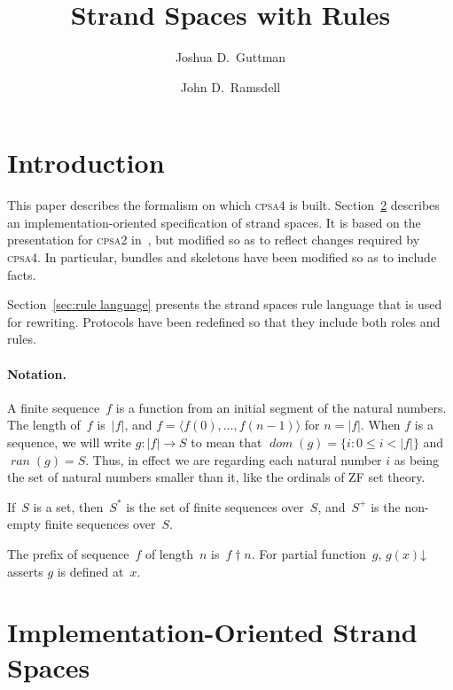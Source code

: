 \documentclass[12pt]{article}
\title{Strand Spaces with Rules}
\author{Joshua D.\ Guttman\and John D.\ Ramsdell}
\newcommand{\cpsa}{\textsc{cpsa}}
\newcommand{\fn}[1]{\ensuremath{\operatorname{\mathit{#1}}}}
\newcommand{\sdom}{\fn{dom}}
\newcommand{\sran}{\fn{ran}}
\newcommand{\seq}[1]{\ensuremath{\langle#1\rangle}}
\newcommand{\prefix}[2]{#1\dagger#2}
\newcommand{\defd}{\mathord\downarrow}
\newcommand{\length}[1]{\ensuremath{|#1|}}
\begin{document}
\maketitle

\section{Introduction}
This paper describes the formalism on which {\cpsa4} is built.
Section~\ref{sec:strand spaces} describes an implementation-oriented
specification of strand spaces.  It is based on the presentation for
{\cpsa2} in~\cite{cpsaspec09}, but modified so as to reflect
changes required by {\cpsa4}.  In particular, bundles and skeletons
have been modified so as to include facts.

Section~\ref{sec:rule language} presents the strand spaces rule
language that is used for rewriting.  Protocols have been redefined
so that they include both roles and rules.

\paragraph{Notation.}

A finite sequence~$f$ is a function from an initial segment of the
natural numbers.  The length of~$f$ is~$\length{f}$, and $f=\seq{f(0),\ldots,
  f(n-1)}$ for $n=\length{f}$.  When $f$ is a sequence, we will write
$g\colon\length{f}\rightarrow S$ to mean that $\sdom(g)=\{i\colon0\le
i<\length{f}\}$ and $\sran(g)=S$.  Thus, in effect we are regarding
each natural number $i$ as being the set of natural numbers smaller
than it, like the ordinals of ZF set theory.

If~$S$ is a set, then~$S^\ast$ is the set of finite sequences
over~$S$, and~$S^+$ is the non-empty finite sequences over~$S$.
\iffalse
The concatenation of sequences~$f_0$ and~$f_1$ is~$f_0\append f_1$.
\fi
The prefix of sequence~$f$ of length~$n$ is~$\prefix{f}{n}$.
For partial function~$g$, $g(x)\defd$ asserts $g$ is defined at~$x$.

\section{Implementation-Oriented Strand Spaces}\label{sec:strand spaces}
\end{document}
